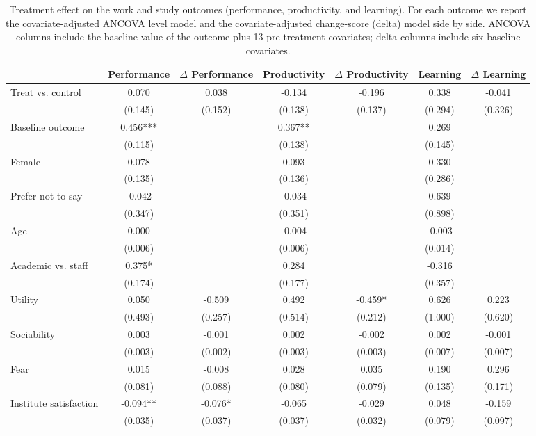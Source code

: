 \begin{table}
\centering
\caption{Treatment effect on the work and study outcomes (performance, productivity, and learning). For each outcome we report the covariate-adjusted ANCOVA level model and the covariate-adjusted change-score (delta) model side by side. ANCOVA columns include the baseline value of the outcome plus 13 pre-treatment covariates; delta columns include six baseline covariates.\label{tab:results-productivity}}
\centering
\begin{tabular}[t]{lcccccc}
\toprule
  & Performance & $\Delta$ Performance & Productivity & $\Delta$ Productivity & Learning & $\Delta$ Learning\\
\midrule
Treat vs. control & 0.070 & 0.038 & -0.134 & -0.196 & 0.338 & -0.041\\
 & (0.145) & (0.152) & (0.138) & (0.137) & (0.294) & (0.326)\\
Baseline outcome & 0.456*** &  & 0.367** &  & 0.269 & \\
 & (0.115) &  & (0.138) &  & (0.145) & \\
Female & 0.078 &  & 0.093 &  & 0.330 & \\
 & (0.135) &  & (0.136) &  & (0.286) & \\
Prefer not to say & -0.042 &  & -0.034 &  & 0.639 & \\
 & (0.347) &  & (0.351) &  & (0.898) & \\
Age & 0.000 &  & -0.004 &  & -0.003 & \\
 & (0.006) &  & (0.006) &  & (0.014) & \\
Academic vs. staff & 0.375* &  & 0.284 &  & -0.316 & \\
 & (0.174) &  & (0.177) &  & (0.357) & \\
Utility & 0.050 & -0.509 & 0.492 & -0.459* & 0.626 & 0.223\\
 & (0.493) & (0.257) & (0.514) & (0.212) & (1.000) & (0.620)\\
Sociability & 0.003 & -0.001 & 0.002 & -0.002 & 0.002 & -0.001\\
 & (0.003) & (0.002) & (0.003) & (0.003) & (0.007) & (0.007)\\
Fear & 0.015 & -0.008 & 0.028 & 0.035 & 0.190 & 0.296\\
 & (0.081) & (0.088) & (0.080) & (0.079) & (0.135) & (0.171)\\
Institute satisfaction & -0.094** & -0.076* & -0.065 & -0.029 & 0.048 & -0.159\\
 & (0.035) & (0.037) & (0.037) & (0.032) & (0.079) & (0.097)\\

\end{tabular}
\end{table}
